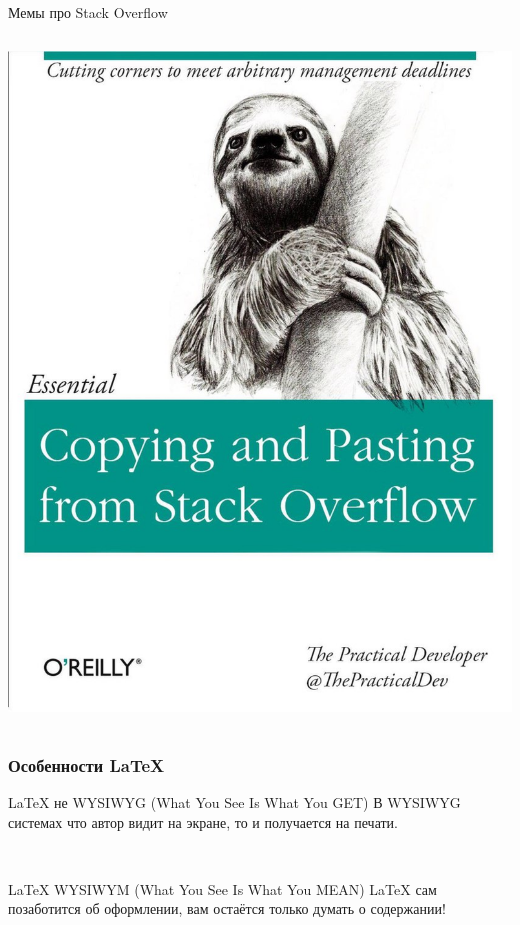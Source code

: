 \documentclass[newPxFont]{beamer}
\begin{document}
\begin{frame}{Мемы про Stack Overflow}
\begin{columns}
\begin{column}{.48\linewidth}
\includegraphics[width=\linewidth]{copypast.jpg}\\	
\end{column}
\end{columns}
\end{frame}


\begin{frame}
\frametitle{Особенности \LaTeX}
\LaTeX{} не WYSIWYG (What You See Is What You GET)
В WYSIWYG системах что автор видит на экране, то и получается на печати.

\mbox{ } 

\LaTeX{} WYSIWYM (What You See Is What You {\color{green} MEAN})
\LaTeX{} сам позаботится об оформлении, вам остаётся только думать о содержании!
\end{frame}
\end{document}
